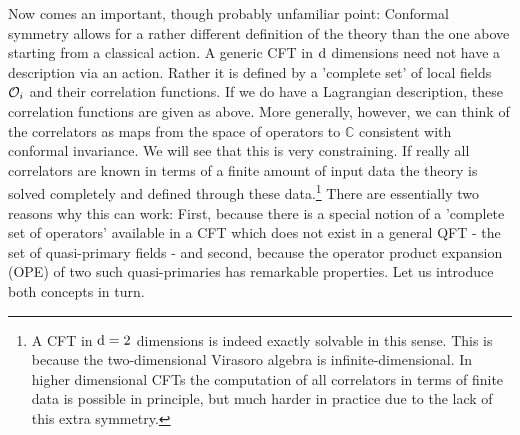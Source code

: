Now comes an important, though probably unfamiliar point: Conformal symmetry allows for a
rather different definition of the theory than the one above starting from a classical action. A
generic CFT in $\mathrm{d}$ dimensions need not have a description via an action. Rather it is defined
by a ’complete set’ of local fields $\mathcal{O}_i$ and their correlation functions. If we do have a Lagrangian
description, these correlation functions are given as above. More generally, however, we can think
of the correlators as maps from the space of operators to $\mathbb{C}$ consistent with conformal invariance.
We will see that this is very constraining. If really all correlators are known in terms of a finite
amount of input data the theory is solved completely and defined through these data.\footnote{A CFT in $\mathrm{d} = 2$ dimensions is indeed exactly solvable in this sense. This is because the two-dimensional
	Virasoro algebra is infinite-dimensional. In higher dimensional CFTs the computation of all correlators in terms
	of finite data is possible in principle, but much harder in practice due to the lack of this extra symmetry.}
There are essentially two reasons why this can work: First, because there is a special notion of
a ’complete set of operators’ available in a CFT which does not exist in a general QFT - the set
of quasi-primary fields - and second, because the operator product expansion (OPE) of two such
quasi-primaries has remarkable properties. Let us introduce both concepts in turn.
